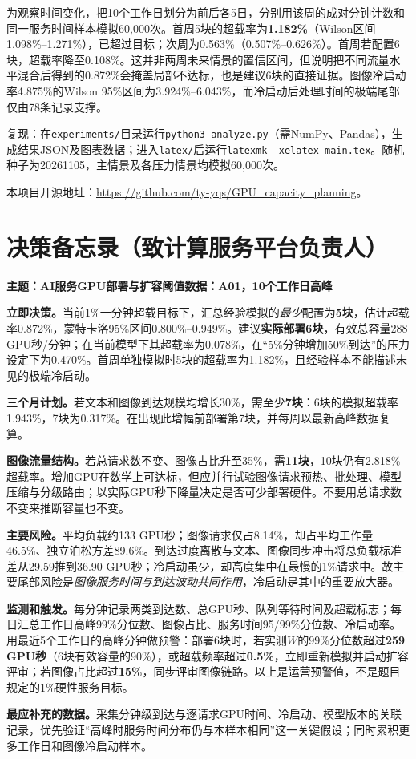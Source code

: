 \documentclass[UTF8,a4paper,11pt,fontset=fandol]{ctexart}
\numberwithin{equation}{section}
\begin{document}
为观察时间变化，把10个工作日划分为前后各5日，分别用该周的成对分钟计数和同一服务时间样本模拟60,000次。首周5块的超载率为\textbf{1.182\%}（Wilson区间1.098\%--1.271\%），已超过目标；次周为0.563\%（0.507\%--0.626\%）。首周若配置6块，超载率降至0.108\%。这并非两周未来情景的置信区间，但说明把不同流量水平混合后得到的0.872\%会掩盖局部不达标，也是建议6块的直接证据。图像冷启动率4.875\%的Wilson 95\%区间为3.924\%--6.043\%，而冷启动后处理时间的极端尾部仅由78条记录支撑。

复现：在\texttt{experiments/}目录运行\texttt{python3 analyze.py}（需NumPy、Pandas），生成结果JSON及图表数据；进入\texttt{latex/}后运行\texttt{latexmk -xelatex main.tex}。随机种子为20261105，主情景及各压力情景均模拟60,000次。

\noindent 本项目开源地址：\url{https://github.com/ty-yqs/GPU_capacity_planning}。

\clearpage
\section*{决策备忘录（致计算服务平台负责人）}
\thispagestyle{fancy}
\noindent\textbf{主题：AI服务GPU部署与扩容阈值}\hfill\textbf{数据：A01，10个工作日高峰}

\medskip
\noindent\textbf{立即决策。}当前1\%一分钟超载目标下，汇总经验模拟的\emph{最少}配置为\textbf{5块}，估计超载率0.872\%，蒙特卡洛95\%区间0.800\%--0.949\%。建议\textbf{实际部署6块}，有效总容量288 GPU秒/分钟；在当前模型下其超载率为0.078\%，在“5\%分钟增加50\%到达”的压力设定下为0.470\%。首周单独模拟时5块的超载率为1.182\%，且经验样本不能描述未见的极端冷启动。

\medskip
\noindent\textbf{三个月计划。}若文本和图像到达规模均增长30\%，需至少\textbf{7块}：6块的模拟超载率1.943\%，7块为0.317\%。在出现此增幅前部署第7块，并每周以最新高峰数据复算。

\medskip
\noindent\textbf{图像流量结构。}若总请求数不变、图像占比升至35\%，需\textbf{11块}，10块仍有2.818\%超载率。增加GPU在数学上可达标，但应并行试验图像请求预热、批处理、模型压缩与分级路由；以实际GPU秒下降量决定是否可少部署硬件。不要用总请求数不变来推断容量也不变。

\medskip
\noindent\textbf{主要风险。}平均负载约133 GPU秒；图像请求仅占8.14\%，却占平均工作量46.5\%、独立泊松方差89.6\%。到达过度离散与文本、图像同步冲击将总负载标准差从29.59推到36.90 GPU秒；冷启动虽少，却高度集中在最慢的1\%请求中。故主要尾部风险是\emph{图像服务时间与到达波动共同作用}，冷启动是其中的重要放大器。

\medskip
\noindent\textbf{监测和触发。}每分钟记录两类到达数、总GPU秒、队列等待时间及超载标志；每日汇总工作日高峰99\%分位数、图像占比、服务时间95/99\%分位数、冷启动率。用最近5个工作日的高峰分钟做预警：部署6块时，若实测$W$的99\%分位数超过\textbf{259 GPU秒}（6块有效容量的90\%），或超载频率超过\textbf{0.5\%}，立即重新模拟并启动扩容评审；若图像占比超过\textbf{15\%}，同步评审图像链路。以上是运营预警值，不是题目规定的1\%硬性服务目标。

\medskip
\noindent\textbf{最应补充的数据。}采集分钟级到达与逐请求GPU时间、冷启动、模型版本的关联记录，优先验证“高峰时服务时间分布仍与本样本相同”这一关键假设；同时累积更多工作日和图像冷启动样本。
\end{document}
